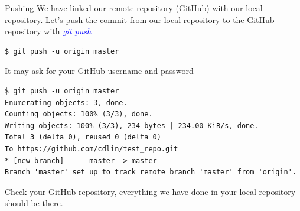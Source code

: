 \documentclass[11pt]{beamer}
\begin{document}
\begin{frame}[fragile]{Pushing}
We have linked our remote repository (GitHub) with our local repository. Let's push the commit from our local repository to the GitHub repository with \textcolor{blue}{\emph{git push}}
\begin{lstlisting}
$ git push -u origin master
\end{lstlisting}
It may ask for your GitHub username and password
\begin{lstlisting}[frame=single]
$ git push -u origin master
Enumerating objects: 3, done.
Counting objects: 100% (3/3), done.
Writing objects: 100% (3/3), 234 bytes | 234.00 KiB/s, done.
Total 3 (delta 0), reused 0 (delta 0)
To https://github.com/cdlin/test_repo.git
* [new branch]      master -> master
Branch 'master' set up to track remote branch 'master' from 'origin'.
\end{lstlisting}
Check your GitHub repository, everything we have done in your local repository should be there.
\end{frame}
\end{document}
